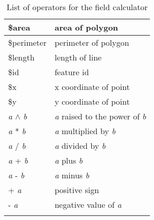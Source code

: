 \begin{center}
{\begin{longtable}{|p{4cm}|p{10cm}|}
\hline \$area & area of polygon \\
\hline \$perimeter & perimeter of polygon \\
\hline \$length & length of line \\
\hline \$id & feature id \\
\hline \$x & x coordinate of point \\
\hline \$y & y coordinate of point \\
\hline \textit{a} $\wedge$ \textit{b} & \textit{a} raised to the power of \textit{b} \\
\hline \textit{a} * \textit{b} & \textit{a} multiplied by \textit{b} \\
\hline \textit{a} / \textit{b} & \textit{a} divided by \textit{b} \\
\hline \textit{a} + \textit{b} & \textit{a} plus \textit{b} \\
\hline \textit{a} - \textit{b} & \textit{a} minus \textit{b} \\
\hline + \textit{a} & positive sign \\
\hline - \textit{a} & negative value of \textit{a} \\
\hline 
\caption{List of operators for the field calculator}\\
\end{longtable}}
\end{center}
